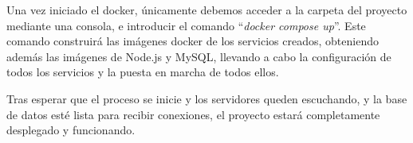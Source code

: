 Una vez iniciado el docker, únicamente debemos acceder a la carpeta del proyecto mediante una consola, e introducir el comando ``\emph{docker compose up}''.
Este comando construirá las imágenes docker de los servicios creados, obteniendo además las imágenes de Node.js y MySQL, llevando a cabo la configuración de todos los servicios y la puesta en marcha de todos ellos.

Tras esperar que el proceso se inicie y los servidores queden escuchando, y la base de datos esté lista para recibir conexiones, el proyecto estará completamente desplegado y funcionando.


  

